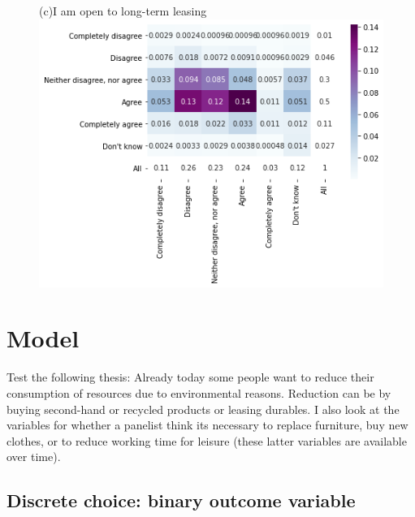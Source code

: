 \documentclass[12pt]{article}
\begin{document}
\begin{figure}[h!!]
\begin{minipage}[h!!]{0.32\textwidth}
	\end{minipage}
	\begin{minipage}[h!!]{0.32\textwidth}  
		\centering\footnotesize{(c)I am open to long-term leasing}
		\includegraphics[width=1\textwidth]{../codding_data/results/liss/joint_heatmap175_141labels0.png}
	\end{minipage}
\end{figure}

\newpage
\section{Model}
Test the following thesis: Already today some people want to reduce their consumption of resources due to environmental reasons. Reduction can be by buying second-hand or recycled products or leasing durables. I also look at the variables for whether a panelist think its necessary to replace furniture, buy new clothes, or to reduce working time for leisure (these latter variables are available over time). 

\subsection{Discrete choice: binary outcome variable}
\end{document}
